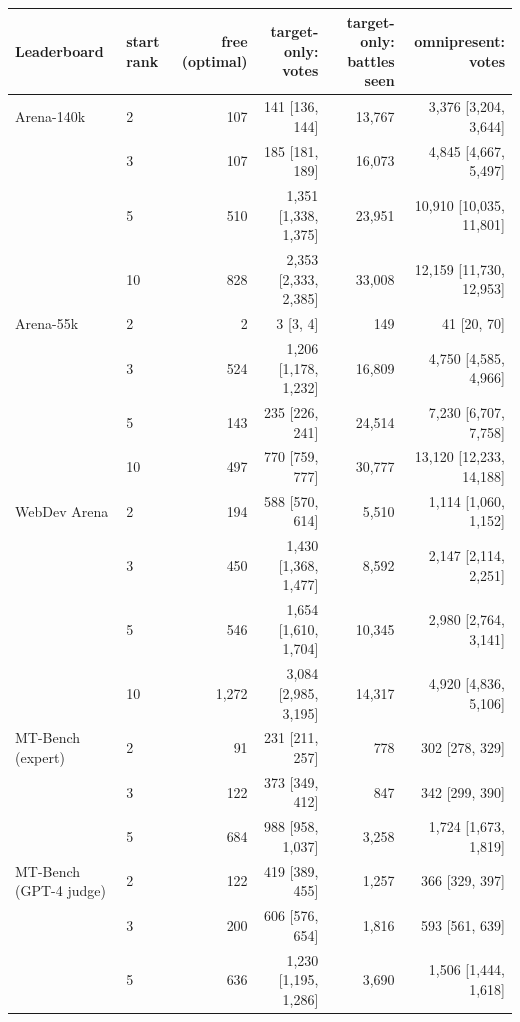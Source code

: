 \begin{tabular}{llrrrr}
\toprule
Leaderboard & start rank & free (optimal) & target-only: votes & target-only: battles seen & omnipresent: votes \\
\midrule
Arena-140k & 2 & 107 & 141 [136, 144] & 13,767 & 3,376 [3,204, 3,644] \\
 & 3 & 107 & 185 [181, 189] & 16,073 & 4,845 [4,667, 5,497] \\
 & 5 & 510 & 1,351 [1,338, 1,375] & 23,951 & 10,910 [10,035, 11,801] \\
 & 10 & 828 & 2,353 [2,333, 2,385] & 33,008 & 12,159 [11,730, 12,953] \\
\addlinespace
Arena-55k & 2 & 2 & 3 [3, 4] & 149 & 41 [20, 70] \\
 & 3 & 524 & 1,206 [1,178, 1,232] & 16,809 & 4,750 [4,585, 4,966] \\
 & 5 & 143 & 235 [226, 241] & 24,514 & 7,230 [6,707, 7,758] \\
 & 10 & 497 & 770 [759, 777] & 30,777 & 13,120 [12,233, 14,188] \\
\addlinespace
WebDev Arena & 2 & 194 & 588 [570, 614] & 5,510 & 1,114 [1,060, 1,152] \\
 & 3 & 450 & 1,430 [1,368, 1,477] & 8,592 & 2,147 [2,114, 2,251] \\
 & 5 & 546 & 1,654 [1,610, 1,704] & 10,345 & 2,980 [2,764, 3,141] \\
 & 10 & 1,272 & 3,084 [2,985, 3,195] & 14,317 & 4,920 [4,836, 5,106] \\
\addlinespace
MT-Bench (expert) & 2 & 91 & 231 [211, 257] & 778 & 302 [278, 329] \\
 & 3 & 122 & 373 [349, 412] & 847 & 342 [299, 390] \\
 & 5 & 684 & 988 [958, 1,037] & 3,258 & 1,724 [1,673, 1,819] \\
\addlinespace
MT-Bench (GPT-4 judge) & 2 & 122 & 419 [389, 455] & 1,257 & 366 [329, 397] \\
 & 3 & 200 & 606 [576, 654] & 1,816 & 593 [561, 639] \\
 & 5 & 636 & 1,230 [1,195, 1,286] & 3,690 & 1,506 [1,444, 1,618] \\
\bottomrule
\end{tabular}
